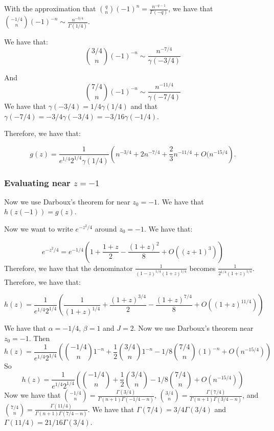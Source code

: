 \documentclass[]{article}
\begin{document}
With the approximation that $\binom{q}{n}(-1)^n = \frac{n^{-q - 1}}{\Gamma(-q)}$, we have that $\binom{-1/4}{n}(-1)^{-n} \sim \frac{n^{-3/4}}{\Gamma(1/4)}$.

We have that:
\begin{equation}
	\binom{3/4}{n}(-1)^{-n} \sim \frac{n^{-7/4}}{\gamma(-3/4)}
\end{equation}

And
\begin{equation}
	\binom{7/4}{n}(-1)^{-n} \sim \frac{n^{-11/4}}{\gamma(-7/4)}
\end{equation}
We have that $\gamma(-3/4) = 1/4 \gamma(1/4)$ and that $\gamma(-7/4) = -3/4 \gamma(-3/4) = -3/16 \gamma(-1/4)$. 

Therefore, we have that:

\begin{equation}
	[z^n]g(z) = \frac{1}{e^{1/4} 2^{1/4}\gamma(1/4)} \left( n^{-3/4} +  2 n^{-7/4} + \frac{2}{3} n^{-11/4} + O(n^{-15/4} \right).
\end{equation}

\subsubsection{Evaluating near $z = -1$}
Now we use Darboux's theorem for near $z_0 = -1$. We have that $h(z(-1)) = g(z)$. 

Now we want to write $e^{-z^2/4}$ around $z_0 = -1$. We have that:

\begin{equation}
	e^{-z^2/4} = e^{-1/4} \left(1 + \frac{1 + z}{2} - \frac{(1 + z)^2}{8} + O((z + 1)^3)\right)
\end{equation}
Therefore, we have that the denominator $\frac{1}{(1 - z)^{1/4} (1 + z)^{1/4}}$ becomes $\frac{1}{2^{1/4}(1 + z)^{1/4}}$. Therefore, we have that:

\begin{equation}
	h(z) = \frac{1}{e^{1/4} 2^{1/4}} \left(\frac{1}{(1 + z)^{1/4}} + \frac{(1 + z)^{3/4}}{2} - \frac{(1 + z)^{7/4}}{8} +  O((1 + z)^{11/4})\right)
\end{equation}

We have that $\alpha = -1/4$, $\beta = 1$ and $J = 2$. 
Now we use Darboux's theorem near $z_0 = -1$. Then 
\begin{equation}
	[z^n] h(z) = \frac{1}{e^{1/4} 2^{1/4}} \left(\binom{-1/4}{n} 1^{-n}+ \frac{1}{2} \binom{3/4}{n} 1^{-n} - 1/8 \binom{7/4}{n} (1)^{-n }+  O(n^{-15/4})\right)
\end{equation}
So 
\begin{equation}
	[z^n] h(z) = \frac{1}{e^{1/4} 2^{1/4}} \left(\binom{-1/4}{n} + \frac{1}{2} \binom{3/4}{n} - 1/8 \binom{7/4}{n}+  O(n^{-15/4})\right)
\end{equation}
Now we have that $\binom{-1/4}{n} = \frac{\Gamma(3/4)}{\Gamma(n + 1) \Gamma(-1/4 - n)}$, $\binom{3/4}{n} = \frac{\Gamma(7/4)}{\Gamma(n + 1) \Gamma(3/4 - n)}$, and $\binom{7/4}{n} = \frac{\Gamma(11/4)}{\Gamma(n + 1) \Gamma(7/4 - n)}$. We have that $\Gamma(7/4) = 3/4 \Gamma(3/4)$ and $\Gamma(11/4) = 21/16 \Gamma(3/4)$. 
\end{document}
